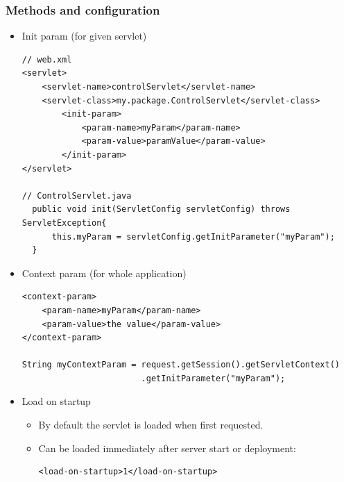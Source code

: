 \documentclass[10pt,xcolor=pdflatex]{beamer}
\begin{document}
\begin{frame}[containsverbatim]\frametitle{Methods and configuration}  
	\begin{itemize}
    	\item Init param (for given servlet)
        {\scriptsize \begin{verbatim} 
// web.xml
<servlet>
    <servlet-name>controlServlet</servlet-name>
    <servlet-class>my.package.ControlServlet</servlet-class>
        <init-param>
            <param-name>myParam</param-name>
            <param-value>paramValue</param-value>
        </init-param>
</servlet>

// ControlServlet.java
  public void init(ServletConfig servletConfig) throws ServletException{
      this.myParam = servletConfig.getInitParameter("myParam");
  }
            \end{verbatim}
            }
        \item Context param (for whole application)
          {\scriptsize \begin{verbatim} 
<context-param>
    <param-name>myParam</param-name>
    <param-value>the value</param-value>
</context-param>

String myContextParam = request.getSession().getServletContext()
                        .getInitParameter("myParam");
\end{verbatim}}
 		\item Load on startup
          \begin{itemize}
            \item By default the servlet is loaded when first requested.
            \item Can be loaded immediately after server start or deployment:
            {\footnotesize \begin{verbatim} 
<load-on-startup>1</load-on-startup>
            \end{verbatim}
            }
          \end{itemize}
    \end{itemize}
\end{frame}
\end{document}
